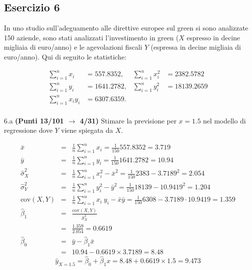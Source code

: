 \documentclass[
  11pt,
]{book}
\theoremstyle{mytheoremstyle}
\theoremstyle{mydefstyle}
\newenvironment{sol}
  {
  \begin{tcolorbox}[enhanced,breakable,arc=0.1mm,boxrule=1pt,colback=white,colframe=iblue,
  title=\bf \fontfamily{lmss}\selectfont \hspace{.5 cm} Soluzione,drop fuzzy shadow]

}{
\end{tcolorbox}
  }
\begin{document}
\subsection{Esercizio 6}\label{esercizio-6-22}

In uno studio sull'adeguamento alle direttive europee sul green si sono analizzate 150 aziende, sono stati analizzati l'investimento in green (\(X\) espresso in decine migliaia di euro/anno) e le agevolazioni fiscali \(Y\) (espressa in decine migliaia di euro/anno). Qui di seguito le statistiche:

\begin{align*}
\sum_{i=1}^n x_i &= 557.8352,   &\sum_{i=1}^n x_i^2 &= 2382.5782 \\
\sum_{i=1}^n y_i &= 1641.2782,   &\sum_{i=1}^n y_i^2 &= 18139.2659 \\
\sum_{i=1}^n x_iy_i &= 6307.6359.    \\
\end{align*}

6.a \textbf{(Punti 13/101 \(\rightarrow\) 4/31)} Stimare la previsione per \(x=1.5\) nel modello di regressione dove \(Y\) viene spiegata da \(X\).

\begin{sol}
\begin{eqnarray*}
           \bar x &=&\frac 1 n\sum_{i=1}^n x_i = \frac {1}{ 150 }  557.8352 =  3.719 \\
           \bar y &=&\frac 1 n\sum_{i=1}^n y_i = \frac {1}{ 150 }  1641.2782 =  10.94 \\
           \hat\sigma_X^2&=&\frac 1 n\sum_{i=1}^n x_i^2-\bar x^2=\frac {1}{ 150 }  2383  - 3.7189 ^2= 2.054 \\
           \hat\sigma_Y^2&=&\frac 1 n\sum_{i=1}^n y_i^2-\bar y^2=\frac {1}{ 150 }  18139  - 10.9419 ^2= 1.204 \\
           \text{cov}(X,Y)&=&\frac 1 n\sum_{i=1}^n x_i~y_i-\bar x\bar y=\frac {1}{ 150 }  6308 - 3.7189 \cdot 10.9419 = 1.359 \\
           \hat\beta_1 &=& \frac{\text{cov}(X,Y)}{\hat\sigma_X^2} \\
                    &=& \frac{ 1.359 }{ 2.054 }  =  0.6619 \\
           \hat\beta_0 &=& \bar y - \hat\beta_1 \bar x\\
                    &=&  10.94 - 0.6619 \times  3.7189 = 8.48 
         \end{eqnarray*}\[\hat y_{X= 1.5 }=\hat\beta_0+\hat\beta_1 x= 8.48 + 0.6619 \times 1.5 = 9.473 \]

\end{sol}
\end{document}
